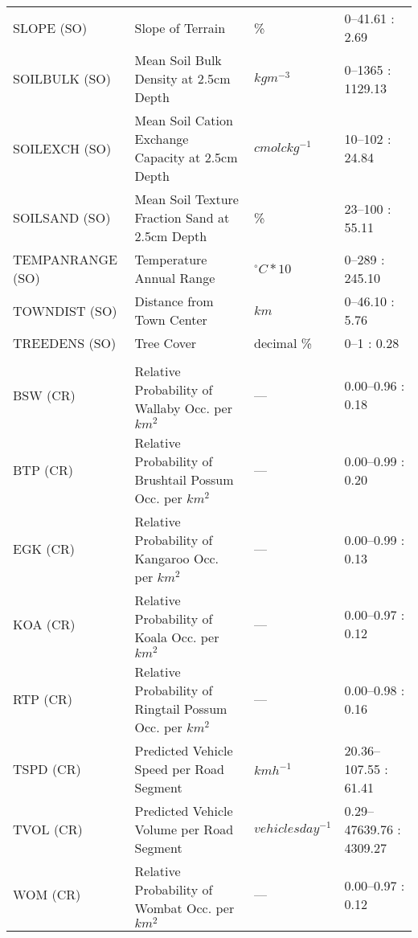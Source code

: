 \begin{table}[!t]
\begin{tabularx}{0.9\textwidth}{lYll}
SLOPE (SO)      &Slope of Terrain                                         &\%             &0--41.61 : 2.69\\
SOILBULK (SO)   &Mean Soil Bulk Density at 2.5cm Depth                    &$kg m^{-3}$    &0--1365 : 1129.13\\
SOILEXCH (SO)   &Mean Soil Cation Exchange Capacity at 2.5cm Depth        &$cmolc kg^{-1}$     &10--102 : 24.84\\
SOILSAND (SO)   &Mean Soil Texture Fraction Sand at 2.5cm Depth           &\%             &23--100 : 55.11\\
TEMPANRANGE (SO)&Temperature Annual Range                                 &$^{\circ}C*10$ &0--289 : 245.10\\
TOWNDIST (SO)   &Distance from Town Center                                &$km$           &0--46.10 : 5.76\\
TREEDENS (SO)   &Tree Cover                                               &decimal \%     &0--1 : 0.28\\
&&&\\
BSW (CR)        &Relative Probability of Wallaby Occ. per $km^2$          &---            &0.00--0.96 : 0.18\\
BTP (CR)        &Relative Probability of Brushtail Possum Occ. per $km^2$ &---            &0.00--0.99 : 0.20\\
EGK (CR)        &Relative Probability of Kangaroo Occ. per $km^2$         &---            &0.00--0.99 : 0.13\\
KOA (CR)        &Relative Probability of Koala Occ. per $km^2$            &---            &0.00--0.97 : 0.12\\
RTP (CR)        &Relative Probability of Ringtail Possum Occ. per $km^2$  &---            &0.00--0.98 : 0.16\\
TSPD (CR)       &Predicted Vehicle Speed per Road Segment                 &$km h^{-1}$    &20.36--107.55 : 61.41\\
TVOL (CR)       &Predicted Vehicle Volume per Road Segment                &$vehicles day^{-1}$ &0.29--47639.76 : 4309.27\\
WOM (CR)        &Relative Probability of Wombat Occ. per $km^2$           &---            &0.00--0.97 : 0.12\\
\bottomrule
\end{tabularx}
\label{6sp_variables}
\end{table}

